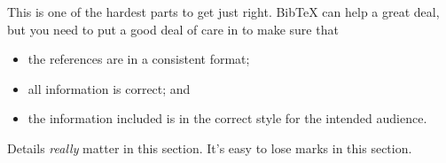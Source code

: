 \documentclass[12pt,a4paper]{article}
\begin{document}
This is one of the hardest parts to get just right. BibTeX can help a
great deal, but you need to put a good deal of care in to make sure
that
\begin{itemize}
\item the references are in a consistent format;

\item all information is correct; and 

\item the information included is in the correct style for the
  intended audience.

\end{itemize}
Details \emph{really} matter in this section. It's easy to lose marks
in this section.
\end{document}
